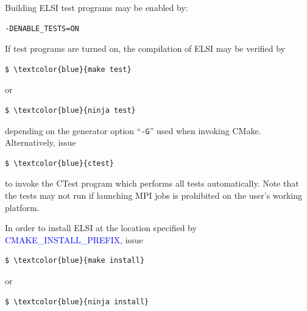 \documentclass{report}
\begin{document}
Building ELSI test programs may be enabled by:
\begin{tcolorbox}
\begin{verbatim}
-DENABLE_TESTS=ON
\end{verbatim}
\end{tcolorbox}

If test programs are turned on, the compilation of ELSI may be verified by
\begin{tcolorbox}
\begin{Verbatim}[commandchars=\\\{\}]
$ \textcolor{blue}{make test}
\end{Verbatim}
\end{tcolorbox}

or
\begin{tcolorbox}
\begin{Verbatim}[commandchars=\\\{\}]
$ \textcolor{blue}{ninja test}
\end{Verbatim}
\end{tcolorbox}

depending on the generator option ``\verb+-G+'' used when invoking CMake.  Alternatively, issue
\begin{tcolorbox}
\begin{Verbatim}[commandchars=\\\{\}]
$ \textcolor{blue}{ctest}
\end{Verbatim}
\end{tcolorbox}

to invoke the CTest program which performs all tests automatically.  Note that the tests may not run if launching MPI jobs is prohibited on the user's working platform.

In order to install ELSI at the location specified by \textcolor{blue}{CMAKE\_INSTALL\_PREFIX}, issue
\begin{tcolorbox}
\begin{Verbatim}[commandchars=\\\{\}]
$ \textcolor{blue}{make install}
\end{Verbatim}
\end{tcolorbox}

or
\begin{tcolorbox}
\begin{Verbatim}[commandchars=\\\{\}]
$ \textcolor{blue}{ninja install}
\end{Verbatim}
\end{tcolorbox}
\end{document}
